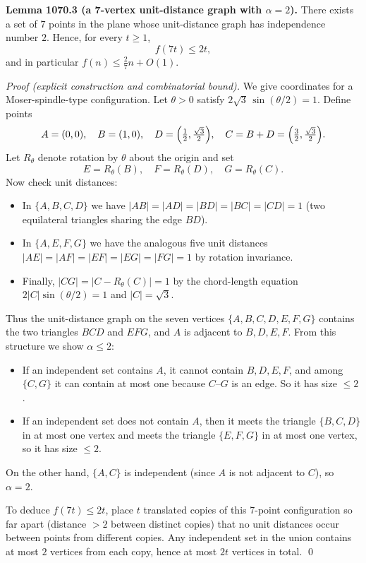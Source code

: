 \textbf{Lemma 1070.3 (a 7-vertex unit-distance graph with $\alpha=2$).}
There exists a set of $7$ points in the plane whose unit-distance graph has independence number $2$.
Hence, for every $t\ge 1$,
\[
 f(7t)\le 2t,
\]
and in particular $f(n)\le \frac{2}{7}n + O(1)$.

\emph{Proof (explicit construction and combinatorial bound).}
We give coordinates for a Moser-spindle-type configuration.
Let $\theta>0$ satisfy $2\sqrt{3}\,\sin(\theta/2)=1$.
Define points
\[
A=(0,0),\quad B=(1,0),\quad D=\Bigl(\tfrac12,\tfrac{\sqrt{3}}{2}\Bigr),\quad C=B+D=\Bigl(\tfrac32,\tfrac{\sqrt{3}}{2}\Bigr).
\]
Let $R_\theta$ denote rotation by $\theta$ about the origin and set
\[
E=R_\theta(B),\quad F=R_\theta(D),\quad G=R_\theta(C).
\]
Now check unit distances:
\begin{itemize}
\item In $\{A,B,C,D\}$ we have $|AB|=|AD|=|BD|=|BC|=|CD|=1$ (two equilateral triangles sharing the edge $BD$).
\item In $\{A,E,F,G\}$ we have the analogous five unit distances $|AE|=|AF|=|EF|=|EG|=|FG|=1$ by rotation invariance.
\item Finally, $|CG|=|C-R_\theta(C)|=1$ by the chord-length equation $2|C|\sin(\theta/2)=1$ and $|C|=\sqrt{3}$.
\end{itemize}
Thus the unit-distance graph on the seven vertices $\{A,B,C,D,E,F,G\}$ contains the two triangles $B\!C\!D$ and $E\!F\!G$, and $A$ is adjacent to $B,D,E,F$.
From this structure we show $\alpha\le 2$:
\begin{itemize}
\item If an independent set contains $A$, it cannot contain $B,D,E,F$, and among $\{C,G\}$ it can contain at most one because $C$--$G$ is an edge. So it has size $\le 2$.
\item If an independent set does not contain $A$, then it meets the triangle $\{B,C,D\}$ in at most one vertex and meets the triangle $\{E,F,G\}$ in at most one vertex, so it has size $\le 2$.
\end{itemize}
On the other hand, $\{A,C\}$ is independent (since $A$ is not adjacent to $C$), so $\alpha=2$.

To deduce $f(7t)\le 2t$, place $t$ translated copies of this 7-point configuration so far apart (distance $>2$ between distinct copies) that no unit distances occur between points from different copies.  Any independent set in the union contains at most $2$ vertices from each copy, hence at most $2t$ vertices in total. \qed

